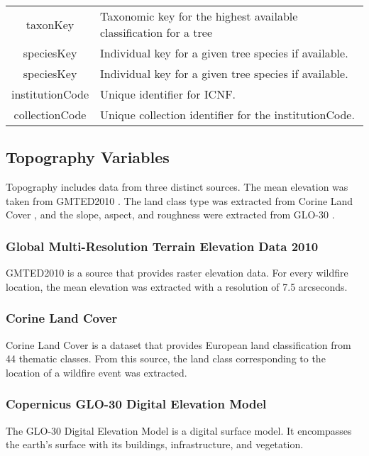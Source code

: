 \begin{table}[H]
\begin{tabular}{cp{7.5cm}}
		taxonKey & Taxonomic key for the highest available classification for a tree \\
		
		speciesKey & Individual key for a given tree species if available. \\
		
		speciesKey & Individual key for a given tree species if available. \\
		
		institutionCode & Unique identifier for ICNF. \\
		
		collectionCode & Unique collection identifier for the institutionCode. \\
	\end{tabular}
\end{table}


\subsection{Topography Variables}
Topography includes data from three distinct sources. The mean elevation was taken from GMTED2010 \cite{Danielson2011}. The land class type was extracted from Corine Land Cover \cite{71c95a07-e296-44fc-b22b-415f42acfdf0}, and the slope, aspect, and roughness were extracted from GLO-30 \cite{ESA_Sinergise_2021}.

\subsubsection{Global Multi-Resolution Terrain Elevation Data 2010 \cite{Danielson2011}}
GMTED2010 is a source that provides raster elevation data. For every wildfire location, the mean elevation was extracted with a resolution of 7.5 arcseconds. 



\subsubsection{Corine Land Cover \cite{71c95a07-e296-44fc-b22b-415f42acfdf0}}
Corine Land Cover is a dataset that provides European land classification from 44 thematic classes. From this source, the land class corresponding to the location of a wildfire event was extracted.


\subsubsection{Copernicus GLO-30 Digital Elevation Model \cite{ESA_Sinergise_2021}}
The GLO-30 Digital Elevation Model is a digital surface model. It encompasses the earth's surface with its buildings, infrastructure, and vegetation.

